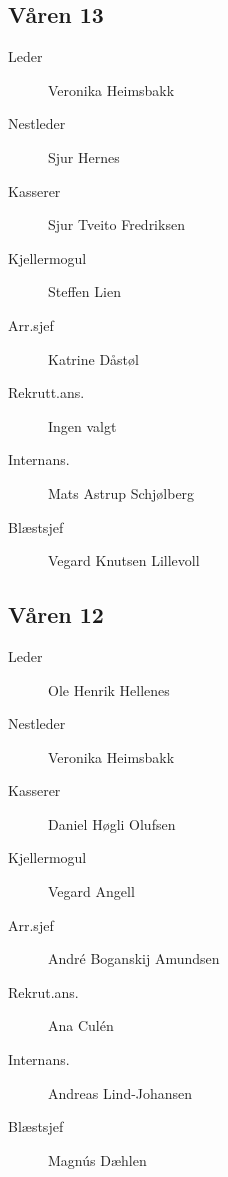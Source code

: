 {\begin{minipage}{0.6\textwidth}
\subsection*{Våren 13}

\begin{description}
	\item[Leder] Veronika Heimsbakk
	\item[Nestleder] Sjur Hernes
	\item[Kasserer] Sjur Tveito Fredriksen
	\item[Kjellermogul] Steffen Lien
	\item[Arr.sjef] Katrine Dåstøl
	\item[Rekrutt.ans.] Ingen valgt
	\item[Internans.] Mats Astrup Schjølberg
	\item[Blæstsjef] Vegard Knutsen Lillevoll
\end{description}
\subsection*{Våren 12}

\begin{description}
	\item[Leder] Ole Henrik Hellenes
	\item[Nestleder] Veronika Heimsbakk
	\item[Kasserer] Daniel Høgli Olufsen
	\item[Kjellermogul] Vegard Angell
	\item[Arr.sjef] André Boganskij Amundsen
	\item[Rekrut.ans.] Ana Culén
	\item[Internans.] Andreas Lind-Johansen
	\item[Blæstsjef] Magnús Dæhlen
\end{description}
\end{minipage}
}
